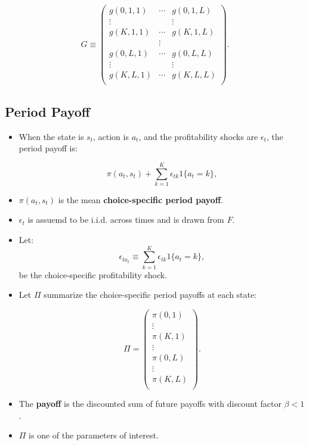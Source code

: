 \documentclass[]{book}
\providecommand{\tightlist}{%
  \setlength{\itemsep}{0pt}\setlength{\parskip}{0pt}}
\begin{document}
\begin{equation}
G \equiv 
\begin{pmatrix}
g(0, 1, 1) & \cdots & g(0, 1, L)\\
\vdots & & \vdots \\
g(K, 1, 1) & \cdots & g(K, 1, L)\\
& \vdots & \\
g(0, L, 1) & \cdots & g(0, L, L)\\
\vdots & & \vdots \\
g(K, L, 1) & \cdots & g(K, L, L)\\
\end{pmatrix}.
\end{equation}

\subsection{Period Payoff}\label{period-payoff}

\begin{itemize}
\tightlist
\item
  When the state is \(s_t\), action is \(a_t\), and the profitability
  shocks are \(\epsilon_t\), the period payoff is:

  \begin{equation}
  \pi(a_t, s_t) + \sum_{k = 1}^K \epsilon_{tk} 1\{a_t = k\},
  \end{equation}
\item
  \(\pi(a_t, s_t)\) is the mean \textbf{choice-specific period payoff}.
\item
  \(\epsilon_t\) is assuemd to be i.i.d. across times and is drawn from
  \(F\).
\item
  Let: \[
  \epsilon_{t a_t} \equiv \sum_{k = 1}^K \epsilon_{tk} 1\{a_t = k\},
  \] be the choice-specific profitability shock.
\item
  Let \(\Pi\) summarize the choice-specific period payoffs at each
  state:

  \begin{equation}
  \Pi =
  \begin{pmatrix}
  \pi(0, 1)\\
  \vdots \\
  \pi(K, 1)\\
  \vdots \\
  \pi(0, L)\\
  \vdots \\
  \pi(K, L)\\
  \end{pmatrix}.
  \end{equation}
\item
  The \textbf{payoff} is the discounted sum of future payoffs with
  discount factor \(\beta < 1\).
\item
  \(\Pi\) is one of the parameters of interest.
\end{itemize}
\end{document}
